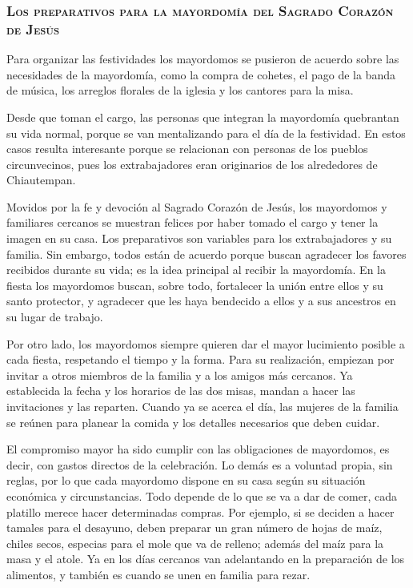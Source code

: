 \documentclass[14pt,letterpaper,twoside]{extbook} %
\begin{document}
\subsubsection{\mdseries\textsc{Los preparativos para la mayordomía del Sagrado Corazón de Jesús}}

\noindent Para organizar las festividades los mayordomos se pusieron de acuerdo sobre las necesidades de la mayordomía, como la compra de cohetes, el pago de la banda de música, los arreglos florales de la iglesia y los cantores para la misa.

Desde que toman el cargo, las personas que integran la mayordomía quebrantan su vida normal, porque se van mentalizando para el día de la festividad. En estos casos resulta interesante porque se relacionan con personas de los pueblos circunvecinos, pues los extrabajadores eran originarios de los alrededores de Chiautempan.

Movidos por la fe y devoción al Sagrado Corazón de Jesús, los mayordomos y familiares cercanos se muestran felices por haber tomado el cargo y tener la imagen en su casa. Los preparativos son variables para los extrabajadores y su familia. Sin embargo, todos están de acuerdo porque buscan agradecer los favores recibidos durante su vida; es la idea principal al recibir la mayordomía. En la fiesta los mayordomos buscan, sobre todo, fortalecer la unión entre ellos y su santo protector, y agradecer que les haya bendecido a ellos y a sus ancestros en su lugar de trabajo.

Por otro lado, los mayordomos siempre quieren dar el mayor lucimiento posible a cada fiesta, respetando el tiempo y la forma. Para su realización, empiezan por invitar a otros miembros de la familia y a los amigos más cercanos. Ya establecida la fecha y los horarios de
las dos misas, mandan a hacer las invitaciones y las reparten. Cuando ya se acerca el día, las mujeres de la familia se reúnen para planear la comida y los detalles necesarios que deben cuidar.

El compromiso mayor ha sido cumplir con las obligaciones de mayordomos, es decir, con gastos directos de la celebración. Lo demás es a voluntad propia, sin reglas, por lo que cada mayordomo dispone en su casa según su situación económica y circunstancias. Todo depende de lo que se va a dar de comer, cada platillo merece hacer determinadas compras. Por ejemplo, si se deciden a hacer tamales para el desayuno, deben preparar un gran número de hojas de maíz, chiles secos, especias para el mole que va de relleno; además del maíz para la masa y el atole. Ya en los días cercanos van adelantando en la preparación de los alimentos, y también es cuando se unen en familia para rezar.
\end{document}
